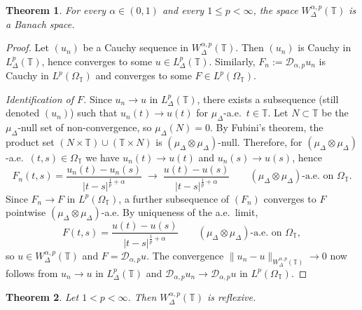 \documentclass[11pt,a4paper]{article}
\numberwithin{equation}{section}
\newtheorem{theorem}{Theorem}[section]
\theoremstyle{definition}
\newcommand{\T}{\mathbb{T}}
\begin{document}
\begin{theorem}\label{thm:banach}
For every $\alpha\in(0,1)$ and every $1\le p<\infty$, the space $W^{\alpha,p}_{\Delta}(\T)$ is a Banach space.
\end{theorem}

\begin{proof}
Let $(u_n)$ be a Cauchy sequence in $W^{\alpha,p}_{\Delta}(\T)$.
Then $(u_n)$ is Cauchy in $L^p_{\Delta}(\T)$, hence converges to
some $u\in L^p_{\Delta}(\T)$. Similarly, $F_n:=\mathcal D_{\alpha,p}u_n$
is Cauchy in $L^p(\Omega_{\T})$ and converges to some
$F\in L^p(\Omega_{\T})$.

\smallskip
\noindent\textit{Identification of $F$.}
Since $u_n\to u$ in $L^p_\Delta(\T)$, there exists a subsequence
(still denoted $(u_n)$) such that $u_n(t)\to u(t)$ for
$\mu_\Delta$-a.e.\ $t\in\T$. Let
$N\subset\T$ be the $\mu_\Delta$-null set of non-convergence,
so $\mu_\Delta(N)=0$. By Fubini's theorem, the product set
$(N\times\T)\cup(\T\times N)$ is $(\mu_\Delta\otimes\mu_\Delta)$-null.
Therefore, for $(\mu_\Delta\otimes\mu_\Delta)$-a.e.\ $(t,s)\in\Omega_\T$
we have $u_n(t)\to u(t)$ and $u_n(s)\to u(s)$, hence
\[
F_n(t,s)
= \frac{u_n(t)-u_n(s)}{|t-s|^{\frac{1}{p}+\alpha}}
\;\longrightarrow\;
\frac{u(t)-u(s)}{|t-s|^{\frac{1}{p}+\alpha}}
\qquad
(\mu_\Delta\otimes\mu_\Delta)\text{-a.e.\ on }\Omega_{\T}.
\]
Since $F_n\to F$ in $L^p(\Omega_{\T})$, a further subsequence of
$(F_n)$ converges to $F$ pointwise $(\mu_\Delta\otimes\mu_\Delta)$-a.e.
By uniqueness of the a.e.\ limit,
\[
F(t,s)=\frac{u(t)-u(s)}{|t-s|^{\frac{1}{p}+\alpha}}
\qquad
(\mu_\Delta\otimes\mu_\Delta)\text{-a.e.\ on }\Omega_{\T},
\]
so $u\in W^{\alpha,p}_{\Delta}(\T)$ and $F=\mathcal D_{\alpha,p}u$.
The convergence $\|u_n-u\|_{W^{\alpha,p}_{\Delta}(\T)}\to 0$ now
follows from $u_n\to u$ in $L^p_{\Delta}(\T)$ and
$\mathcal D_{\alpha,p}u_n\to\mathcal D_{\alpha,p}u$ in $L^p(\Omega_{\T})$.
\end{proof}

\begin{theorem}\label{thm:reflexive}
Let $1<p<\infty$. Then $W^{\alpha,p}_{\Delta}(\T)$ is reflexive.
\end{theorem}
\end{document}
